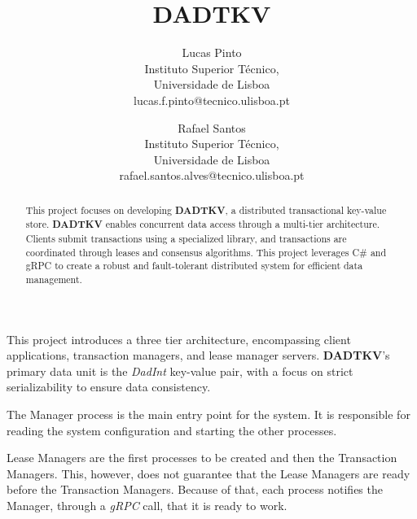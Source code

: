 \documentclass[times, 10pt,twocolumn]{article}
\begin{document}
\title{DADTKV}

\author{Lucas Pinto\\
Instituto Superior Técnico,\\
Universidade de Lisboa\\
lucas.f.pinto@tecnico.ulisboa.pt\\
\and
Rafael Santos\\
Instituto Superior Técnico,\\
Universidade de Lisboa\\ 
rafael.santos.alves@tecnico.ulisboa.pt\\
}

\maketitle
\thispagestyle{empty}

\begin{abstract}
   This project focuses on developing \textbf{DADTKV}, a distributed transactional key-value store.
   \textbf{DADTKV} enables concurrent data access through a multi-tier architecture.
   Clients submit transactions using a specialized library, and transactions are coordinated
   through leases and consensus algorithms. This project leverages C\# and gRPC to create
   a robust and fault-tolerant distributed system for efficient data management.
\end{abstract}




This project introduces a three tier architecture, encompassing client applications,
transaction managers, and lease manager servers. \textbf{DADTKV}'s primary data unit is the \textit{DadInt}
key-value pair, with a focus on strict serializability to ensure data consistency.


The Manager process is the main entry point for the system. It is responsible for reading
the system configuration and starting the other processes.

Lease Managers are the first processes to be created and then the Transaction Managers.
This, however, does not guarantee that the Lease Managers are ready before the Transaction Managers.
Because of that, each process notifies the Manager, through a \textit{gRPC} call, that it is ready to work.
\end{document}
